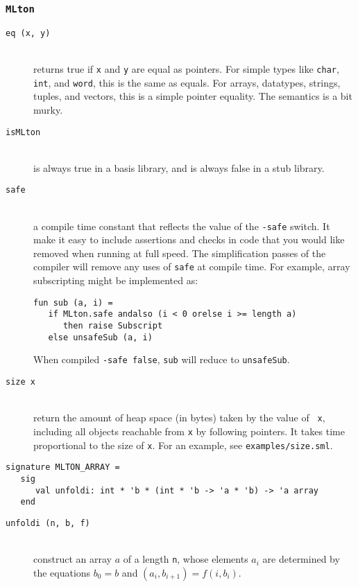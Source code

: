 \subsubsection{{\tt MLton}}

\newcommand{\entry}[1]{\item[\tt #1]\hspace{1in}\\}
\begin{description}

\entry{eq (x, y)}
returns true if {\tt x} and {\tt y} are equal as pointers.  For simple types
like {\tt char}, {\tt int}, and {\tt word}, this is the same as equals.  For
arrays, datatypes, strings, tuples, and vectors, this is a simple pointer
equality.  The semantics is a bit murky.

\entry{isMLton}
is always true in a {\mlton} basis library, and is always false in a stub
library.

\entry{safe}
a compile time constant that reflects the value of the {\tt -safe} switch.  It
make it easy to include assertions and checks in code that you would like
removed when running at full speed. The simplification passes of the compiler
will remove any uses of {\tt safe} at compile time.  For example, array
subscripting might be implemented as:
\begin{verbatim}
fun sub (a, i) =
   if MLton.safe andalso (i < 0 orelse i >= length a)
      then raise Subscript
   else unsafeSub (a, i)
\end{verbatim}
When compiled {\tt -safe false}, {\tt sub} will reduce to
{\tt unsafeSub}.

\entry{size x}
return the amount of heap space (in bytes) taken by the value of {\tt
x}, including all objects reachable from {\tt x} by following
pointers.  It takes time proportional to the size of {\tt x}.  For an
example, see {\tt examples/size.sml}.

\end{description}


\begin{verbatim}
signature MLTON_ARRAY =
   sig
      val unfoldi: int * 'b * (int * 'b -> 'a * 'b) -> 'a array
   end
\end{verbatim}

\begin{description}

\entry{unfoldi (n, b, f)}
construct an array $a$ of a length {\tt n}, whose elements $a_i$ are determined
by the equations $b_0 = b$ and $(a_i, b_{i+1}) = f (i, b_i)$.

\end{description}
%
